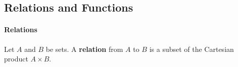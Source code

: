 \subsection{Relations and Functions}

\paragraph*{Relations}
Let $A$ and $B$ be sets. A \textbf{relation} from $A$ to $B$ is a subset of the Cartesian product $A\times B$.\\
